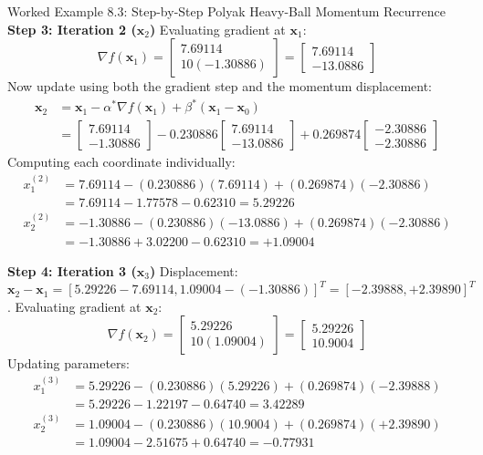 \begin{examplebox}[breakable]{Worked Example 8.3: Step-by-Step Polyak Heavy-Ball Momentum Recurrence}
\textbf{Step 3: Iteration 2 ($\mathbf{x}_2$)}
Evaluating gradient at $\mathbf{x}_1$:
\begin{equation}
\nabla f(\mathbf{x}_1) = \begin{bmatrix} 7.69114 \\ 10(-1.30886) \end{bmatrix} = \begin{bmatrix} 7.69114 \\ -13.0886 \end{bmatrix}
\end{equation}
Now update using both the gradient step and the momentum displacement:
\begin{align}
\mathbf{x}_2 &= \mathbf{x}_1 - \alpha^* \nabla f(\mathbf{x}_1) + \beta^*(\mathbf{x}_1 - \mathbf{x}_0) \nonumber \\
&= \begin{bmatrix} 7.69114 \\ -1.30886 \end{bmatrix} - 0.230886 \begin{bmatrix} 7.69114 \\ -13.0886 \end{bmatrix} + 0.269874 \begin{bmatrix} -2.30886 \\ -2.30886 \end{bmatrix}
\end{align}
Computing each coordinate individually:
\begin{align}
x_1^{(2)} &= 7.69114 - (0.230886)(7.69114) + (0.269874)(-2.30886) \nonumber \\
&= 7.69114 - 1.77578 - 0.62310 = \mathbf{5.29226} \\
x_2^{(2)} &= -1.30886 - (0.230886)(-13.0886) + (0.269874)(-2.30886) \nonumber \\
&= -1.30886 + 3.02200 - 0.62310 = \mathbf{+1.09004}
\end{align}

\textbf{Step 4: Iteration 3 ($\mathbf{x}_3$)}
Displacement: $\mathbf{x}_2 - \mathbf{x}_1 = [5.29226 - 7.69114, 1.09004 - (-1.30886)]^T = [-2.39888, +2.39890]^T$.
Evaluating gradient at $\mathbf{x}_2$:
\begin{equation}
\nabla f(\mathbf{x}_2) = \begin{bmatrix} 5.29226 \\ 10(1.09004) \end{bmatrix} = \begin{bmatrix} 5.29226 \\ 10.9004 \end{bmatrix}
\end{equation}
Updating parameters:
\begin{align}
x_1^{(3)} &= 5.29226 - (0.230886)(5.29226) + (0.269874)(-2.39888) \nonumber \\
&= 5.29226 - 1.22197 - 0.64740 = \mathbf{3.42289} \\
x_2^{(3)} &= 1.09004 - (0.230886)(10.9004) + (0.269874)(+2.39890) \nonumber \\
&= 1.09004 - 2.51675 + 0.64740 = \mathbf{-0.77931}
\end{align}


\end{examplebox}
